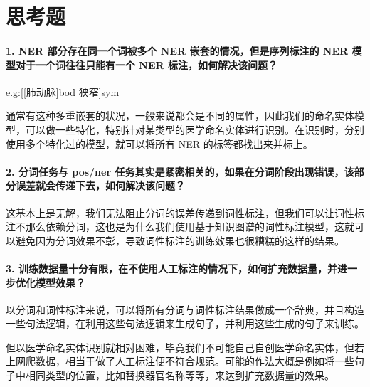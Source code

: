 \section{思考题}
\label{sec:question}

\paragraph{1. NER 部分存在同一个词被多个 NER 嵌套的情况，但是序列标注的 NER 模型对于一个词往往只能有一个 NER 标注，如何解决该问题？} e.g:[[肺动脉]bod 狭窄]sym

通常有这种多重嵌套的状况，一般来说都会是不同的属性，因此我们的命名实体模型，可以做一些特化，特别针对某类型的医学命名实体进行识别。在识别时，分别使用多个特化过的模型，就可以将所有 NER 的标签都找出来并标上。

\paragraph{2. 分词任务与 pos/ner 任务其实是紧密相关的，如果在分词阶段出现错误，该部分误差就会传递下去，如何解决该问题？ \\}

这基本上是无解，我们无法阻止分词的误差传递到词性标注，但我们可以让词性标注不那么依赖分词，这也是为什么我们使用基于知识图谱的词性标注模型，这就可以避免因为分词效果不彰，导致词性标注的训练效果也很糟糕的这样的结果。

\paragraph{3. 训练数据量十分有限，在不使用人工标注的情况下，如何扩充数据量，并进一步优化模型效果？ \\}

以分词和词性标注来说，可以将所有分词与词性标注结果做成一个辞典，并且构造一些句法逻辑，在利用这些句法逻辑来生成句子，并利用这些生成的句子来训练。

但以医学命名实体识别就相对困难，毕竟我们不可能自己自创医学命名实体，但若上网爬数据，相当于做了人工标注便不符合规范。可能的作法大概是例如将一些句子中相同类型的位置，比如替换器官名称等等，来达到扩充数据量的效果。
